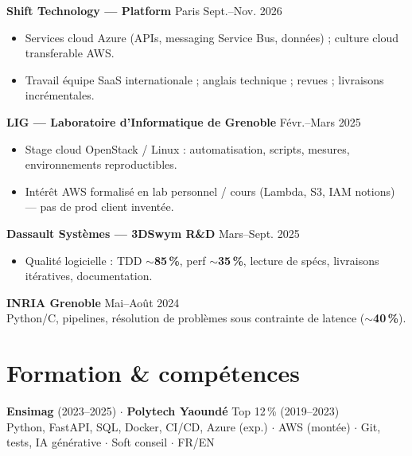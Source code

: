 \documentclass[10pt,a4paper]{article}
\begin{document}
\textbf{Shift Technology --- Platform} \hfill Paris \hfill Sept.--Nov. 2026
\begin{itemize}
  \item Services cloud Azure (APIs, messaging Service Bus, donn\'ees) ; culture cloud transferable AWS.
  \item Travail \'equipe SaaS internationale ; anglais technique ; revues ; livraisons incr\'ementales.
\end{itemize}

\textbf{LIG --- Laboratoire d'Informatique de Grenoble} \hfill F\'evr.--Mars 2025
\begin{itemize}
  \item Stage cloud OpenStack / Linux : automatisation, scripts, mesures, environnements reproductibles.
  \item Int\'er\^et AWS formalis\'e en lab personnel / cours (Lambda, S3, IAM notions) --- pas de prod client invent\'ee.
\end{itemize}

\textbf{Dassault Syst\`emes --- 3DSwym R\&D} \hfill Mars--Sept. 2025
\begin{itemize}
  \item Qualit\'e logicielle : TDD $\sim$\textbf{85\,\%}, perf $\sim$\textbf{35\,\%}, lecture de sp\'ecs, livraisons it\'eratives, documentation.
\end{itemize}

\textbf{INRIA Grenoble} \hfill Mai--Ao\^ut 2024\\
Python/C, pipelines, r\'esolution de probl\`emes sous contrainte de latence ($\sim$\textbf{40\,\%}).

\section{Formation \& comp\'etences}
\textbf{Ensimag} (2023--2025) $\cdot$ \textbf{Polytech Yaound\'e} Top 12\,\% (2019--2023)\\
Python, FastAPI, SQL, Docker, CI/CD, Azure (exp.) $\cdot$ AWS (mont\'ee) $\cdot$ Git, tests, IA g\'en\'erative $\cdot$ Soft conseil $\cdot$ FR/EN
\end{document}
